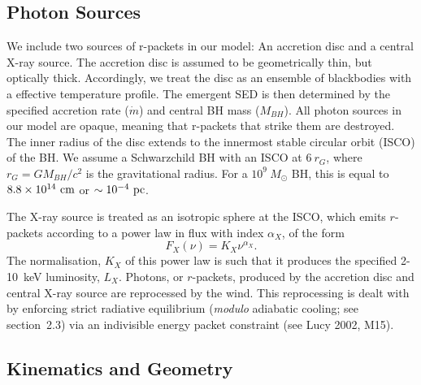 \documentclass[useAMS,usenatbib]{mn2e_x}
\begin{document}
\subsection{Photon Sources}
\label{sec:photon_sources}

We include two sources of r-packets in our model:
An accretion disc and a central X-ray source.
The accretion disc is assumed to be geometrically thin, but optically thick.
Accordingly, we treat the disc as an ensemble of blackbodies with a 
\cite{shakurasunyaev1973} effective temperature profile. 
The emergent SED is then determined by the specified accretion rate ($\dot{m}$)
and central BH mass ($M_{BH}$).
All photon sources in our model are opaque, meaning
that r-packets that strike them are destroyed.
The inner radius of the disc extends to the innermost 
stable circular orbit (ISCO) of the BH. 
We assume a Schwarzchild BH with an ISCO at $6~r_G$, where 
$r_G = GM_{BH}/c^2$ is the gravitational radius.
For a $10^9~M_\odot$ BH, this is equal to $8.8\times10^{14}~{\rm cm}$ 
or $\sim10^{-4}~{\rm pc}$.  


The X-ray source is treated as an isotropic sphere at the ISCO,
which emits $r$-packets according to a power law in flux with index $\alpha_X$, of the form
\begin{equation}
F_X (\nu) = K_X \nu^{\alpha_X}.
\end{equation}
The normalisation, $K_X$ of this power law is such that it 
produces the specified 2-10~keV luminosity, $L_X$.
Photons, or $r$-packets, produced by the accretion disc and central X-ray source
are reprocessed by the wind. This reprocessing is dealt with by enforcing strict
radiative equilibrium ({\em modulo} adiabatic cooling; see section~2.3)
via an indivisible energy packet constraint (see Lucy 2002, M15).  

\subsection{Kinematics and Geometry}
\end{document}
